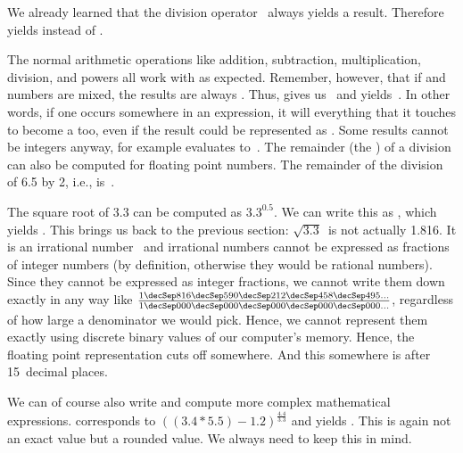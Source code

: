 We already learned that the division operator~\pythonilIdx{/} always yields a  result.
Therefore  yields  instead of .

The normal arithmetic operations like addition, subtraction, multiplication, division, and powers all work with  as expected.
Remember, however, that if  and  numbers are mixed, the results are always .
Thus, \pythonIdx{+} gives us~ and  yields~.
In other words, if one  occurs somewhere in an expression, it will  everything that it touches to become a  too, even if the result could be represented as .
Some results cannot be integers anyway, for example \pythonIdx{-} evaluates to~.
The remainder (the ) of a division can also be computed for floating point numbers.
The remainder of the division of 6.5 by 2, i.e., \expandafter{}\pythonIdx{\%} is~.%
%
\begin{sloppypar}%
The square root of 3.3 can be computed as $3.3^{0.5}$.
We can write this as , which yields .
This brings us back to the previous section:
$\sqrt{3.3}$~is not actually 1.816.
It is an irrational number~\cite{S1988WPCHD,B1991IWNT} and irrational numbers cannot be expressed as fractions of integer numbers (by definition, otherwise they would be rational numbers).
Since they cannot be expressed as integer fractions, we cannot write them down exactly in any way like $\frac{1\decSep816\decSep590\decSep212\decSep458\decSep495\dots}{1\decSep000\decSep000\decSep000\decSep000\decSep000\dots}$, regardless of how large a denominator we would pick.
Hence, we cannot represent them exactly using discrete binary values of our computer's memory.
Hence, the floating point representation cuts off somewhere.
And this somewhere is after 15~decimal places.%
\end{sloppypar}%
%
\begin{sloppypar}%
We can of course also write and compute more complex mathematical expressions.
\pythonIdx{(}\pythonIdx{)} corresponds to $((3.4*5.5)-1.2)^{\frac{4.4}{3.3}}$ and yields .
This is again not an exact value but a rounded value.
We always need to keep this in mind.%
\end{sloppypar}%
